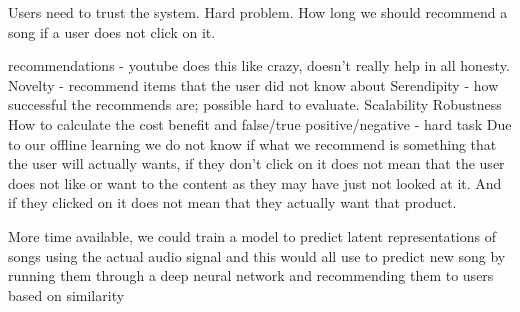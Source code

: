 \documentclass{article} %
\begin{document}
Users need to trust the system. Hard problem. How long we should recommend a song if a user does not click on it.

recommendations - youtube does this like crazy, doesn’t really help in all honesty.
Novelty - recommend items that the user did not know about
Serendipity - how successful the recommends are; possible hard to evaluate. 
Scalability 
Robustness
How to calculate the cost benefit and false/true positive/negative - hard task
Due to our offline learning we do not know if what we recommend is something that the user will actually wants, if they don’t click on it does not mean that the user does not like or want to the content as they may have just not looked at it. And if they clicked on it does not mean that they actually want that product.

More time available, we could train a model to predict latent representations of songs using the actual audio signal and this would all use to predict new song by running them through a deep neural network and recommending them to users based on similarity
\end{document}
